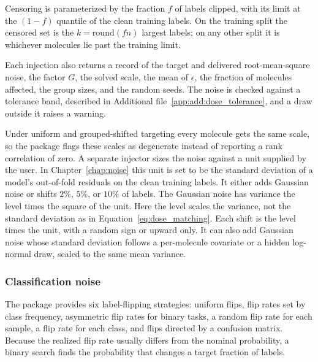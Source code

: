 Censoring is parameterized by the fraction $f$ of labels clipped, with its limit at the $(1-f)$ quantile
of the clean training labels. On the training split the censored
set is the $k = \mathrm{round}(fn)$ largest labels; on any other split it is whichever
molecules lie past the training limit.

Each injection also returns a record of the target and delivered root-mean-square noise, the factor
$G$, the solved scale, the mean of $\epsilon$, the fraction of molecules affected, the group sizes, and the random seeds.
The noise is checked against a tolerance band, described in Additional file~\ref{app:add:dose_tolerance}, and a draw outside it raises a warning.

Under uniform and grouped-shifted targeting every molecule gets the same scale, so the package flags these scales
as degenerate instead of reporting a rank correlation of zero.
A separate injector sizes the noise against a unit supplied by the user. In Chapter~\ref{chap:noise} this unit is set to be the standard deviation of a model's out-of-fold residuals on
the clean training labels. It either adds Gaussian noise or shifts $2\%$, $5\%$, or $10\%$ of labels. The Gaussian noise has variance the level times the square of the unit. Here the level scales the variance, not the standard deviation as in Equation~\ref{eq:dose_matching}. Each shift is the level times the unit, with a random sign or upward only. It can also add
Gaussian noise whose standard deviation follows a per-molecule covariate or a hidden
log-normal draw, scaled to the same mean variance.

\subsubsection{Classification noise}
The package provides six label-flipping strategies: uniform flips,
flip rates set by class frequency, asymmetric flip rates for binary tasks, a random flip rate for each sample,
a flip rate for each class, and flips directed by a confusion matrix. Because the realized
flip rate usually differs from the nominal probability, a binary search
finds the probability that changes a target fraction of labels.

